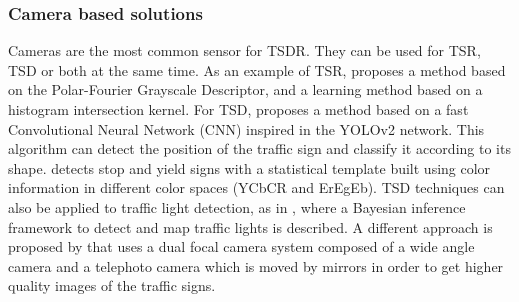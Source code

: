 \subsubsection{Camera based solutions}
Cameras are the most common sensor for TSDR. They can be used for TSR, TSD or both at the same time.
As an example of TSR, \cite{frejlichowski2015application} proposes a method 
based on the Polar-Fourier Grayscale Descriptor, and \cite{gao2015learning} a 
learning method based on a histogram intersection kernel.
For TSD, \cite{zhang2017real} proposes a method based on a fast Convolutional 
Neural Network (CNN) inspired in the YOLOv2 network. This algorithm 
can detect the position of the traffic sign and classify it according to its shape. 
\cite{villalon2017traffic} detects stop and yield signs with a statistical 
template built using color information in different color spaces (YCbCR and ErEgEb).
TSD techniques can also be applied to traffic light detection, as in 
\cite{hosseinyalamdary2017bayesian}, where a Bayesian inference framework to 
detect and map traffic lights is described. A different approach is proposed by 
\cite{gu2011traffic} that uses a dual focal camera system composed of a wide 
angle camera and a telephoto camera which is moved by mirrors 
in order to get higher quality images of the traffic signs.
